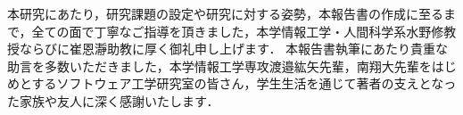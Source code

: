 \documentclass[main]{subfiles}
\begin{document}
\acknowledgement

本研究にあたり，研究課題の設定や研究に対する姿勢，本報告書の作成に至るまで，全ての面で丁寧なご指導を頂きました，本学情報工学・人間科学系水野修教授ならびに崔恩瀞助教に厚く御礼申し上げます．
本報告書執筆にあたり貴重な助言を多数いただきました，本学情報工学専攻渡邉紘矢先輩，南翔大先輩をはじめとするソフトウェア工学研究室の皆さん，学生生活を通じて著者の支えとなった家族や友人に深く感謝いたします．
\end{document}
